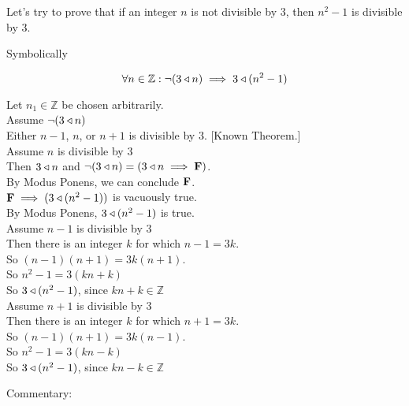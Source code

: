 \begin{example}
		Let's try to prove that if an integer $n$ is not divisible by $3$, then $n^2 -1$ is divisible by $3$.
		
		Symbolically
		
		\[
		\forall n \in \mathbb{Z}: \neg(3\triangleleft n) \implies 3 \triangleleft (n^2 - 1)
		\]
		
		\begin{fitch}
				\textrm{Let $n_1 \in \mathbb{Z}$ be chosen arbitrarily.}\\
				\textrm{Assume $\neg(3 \triangleleft n)$}\\
				\fa \textrm{Either $n-1$, $n$, or $n+1$ is divisible by $3$. [Known Theorem.]}\\
				\fa \textrm{Assume $n$ is divisible by $3$}\\
				\fa \fa \textrm{Then $3 \triangleleft n$ and $\neg (3 \triangleleft n) = (3 \triangleleft n \implies \textbf{\textrm{F}})$.}\\
				\fa \fa \textrm{By Modus Ponens, we can conclude $\textbf{\textrm{F}}$.}\\
				\fa \fa \textrm{$\textbf{\textrm{F}} \implies (3 \triangleleft (n^2 - 1))$ is vacuously true.}\\
				\fa \fa \textrm{By Modus Ponens, $3 \triangleleft (n^2 - 1)$ is true.}\\
				\fa \textrm{Assume $n-1$ is divisible by $3$}\\
				\fa \fa \textrm{Then there is an integer $k$ for which $n-1 = 3k$.}\\
				\fa \fa \textrm{So $(n-1)(n+1) = 3k(n+1)$.}\\
				\fa \fa \textrm{So $n^2- 1 = 3(kn+k)$}\\
				\fa \fa \textrm{So $3 \triangleleft (n^2 - 1)$, since $kn+k \in \mathbb{Z}$}\\
				\fa \textrm{Assume $n+1$ is divisible by $3$}\\
				\fa \fa \textrm{Then there is an integer $k$ for which $n+1 = 3k$.}\\
				\fa \fa \textrm{So $(n-1)(n+1) = 3k(n-1)$.}\\
				\fa \fa \textrm{So $n^2- 1 = 3(kn-k)$}\\
				\fa \fa \textrm{So $3 \triangleleft (n^2 - 1)$, since $kn-k \in \mathbb{Z}$}
			\end{fitch}
		
		Commentary:
		

\end{example}
